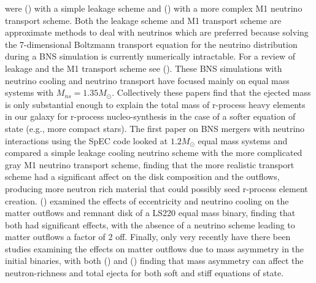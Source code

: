 were (\cite{neilsen2014magnetized, palenzuela2015effects}) with a simple leakage scheme and (\cite{sekiguchi2015dynamical}) with a more complex M1 neutrino transport scheme. Both the leakage scheme and M1 transport scheme are approximate methods to deal with neutrinos which are preferred because solving the 7-dimensional Boltzmann transport equation for the neutrino distribution during a BNS simulation is currently numerically intractable. For a review of leakage and the M1 transport scheme see (\cite{foucart2015post}). These BNS simulations with neutrino cooling and neutrino transport have focused mainly on equal mass systems with $M_{ns} = 1.35M_{\odot}$. Collectively these papers find that the ejected mass is only substantial  enough to explain the total mass of r-process heavy elements in our galaxy for r-process nucleo-synthesis in the case of a softer equation of state (e.g., more compact stars). The first paper on BNS mergers with neutrino interactions using the SpEC code looked at $1.2M_{\odot}$ equal mass systems and compared a simple leakage cooling neutrino scheme with the more complicated gray M1 neutrino transport scheme, finding that the more realistic transport scheme had a significant affect on the disk composition and the outflows, producing more neutron rich material that could possibly seed r-process element creation. (\cite{radice2016dynamical}) examined the effects of eccentricity and neutrino cooling on the matter outflows and remnant disk of a LS220 equal mass binary, finding that both had significant effects, with the absence of a neutrino scheme leading to matter outflows a factor of 2 off. Finally, only very recently have there been studies examining the effects on matter outflows due to mass asymmetry in the initial binaries, with both (\cite{lehner2016unequal}) and (\cite{sekiguchi2016dynamical}) finding that mass asymmetry can affect the neutron-richness and total ejecta for both soft and stiff equations of state.

